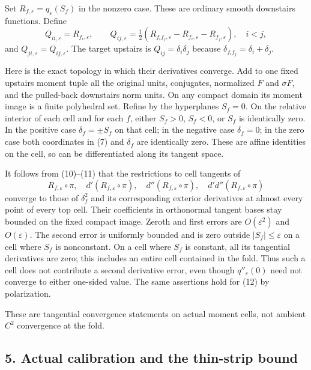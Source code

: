 \documentclass[
  11pt,
]{article}
\begin{document}
Set \(R_{f,\varepsilon}=q_\varepsilon(S_f)\) in the nonzero case. These
are ordinary smooth downstairs functions. Define \[
 Q_{ii,\varepsilon}=R_{f_i,\varepsilon},\qquad
 Q_{ij,\varepsilon}
  =\tfrac12(R_{f_if_j,\varepsilon}
                   -R_{f_i,\varepsilon}-R_{f_j,\varepsilon}),\quad i<j,
                                                                    \tag{12}
\] and \(Q_{ji,\varepsilon}=Q_{ij,\varepsilon}\). The target upstairs is
\(Q_{ij}=\delta_i\delta_j\) because
\(\delta_{f_if_j}=\delta_i+\delta_j\).

Here is the exact topology in which their derivatives converge. Add to
one fixed upstairs moment tuple all the original units, conjugates,
normalized \(F\) and \(\sigma F\), and the pulled-back downstairs norm
units. On any compact domain its moment image is a finite polyhedral
set. Refine by the hyperplanes \(S_f=0\). On the relative interior of
each cell and for each \(f\), either \(S_f>0\), \(S_f<0\), or \(S_f\) is
identically zero. In the positive case \(\delta_f=\pm S_f\) on that
cell; in the negative case \(\delta_f=0\); in the zero case both
coordinates in (7) and \(\delta_f\) are identically zero. These are
affine identities on the cell, so can be differentiated along its
tangent space.

It follows from (10)--(11) that the restrictions to cell tangents of \[
 R_{f,\varepsilon}\circ\pi,\quad d'(R_{f,\varepsilon}\circ\pi),
 \quad d''(R_{f,\varepsilon}\circ\pi),\quad
 d'd''(R_{f,\varepsilon}\circ\pi)                          \tag{13}
\] converge to those of \(\delta_f^2\) and its corresponding exterior
derivatives at almost every point of every top cell. Their coefficients
in orthonormal tangent bases stay bounded on the fixed compact image.
Zeroth and first errors are \(O(\varepsilon^2)\) and \(O(\varepsilon)\).
The second error is uniformly bounded and is zero outside
\(|S_f|\leq\varepsilon\) on a cell where \(S_f\) is nonconstant. On a
cell where \(S_f\) is constant, all its tangential derivatives are zero;
this includes an entire cell contained in the fold. Thus such a cell
does not contribute a second derivative error, even though
\(q''_\varepsilon(0)\) need not converge to either one-sided value. The
same assertions hold for (12) by polarization.

These are tangential convergence statements on actual moment cells, not
ambient \(C^2\) convergence at the fold.

\subsection{5. Actual calibration and the thin-strip
bound}\label{actual-calibration-and-the-thin-strip-bound}
\end{document}
